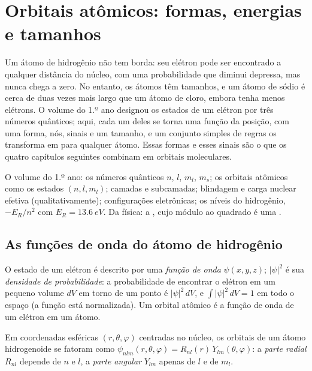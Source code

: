 \chapter{Orbitais atômicos: formas, energias e tamanhos}\label{ch:b2:atomic-orbitals}

Um átomo de hidrogênio não tem borda: seu elétron pode ser encontrado a
qualquer distância do núcleo, com uma probabilidade que diminui depressa, mas
nunca chega a zero. No entanto, os átomos têm tamanhos, e um átomo de sódio
é cerca de duas vezes mais largo que um átomo de cloro, embora tenha menos
elétrons. O volume do 1.º ano designou os estados de um elétron por três
números quânticos; aqui, cada um deles se torna uma função da posição, com
uma forma, nós, sinais e um tamanho, e um conjunto simples de regras os
transforma em  para qualquer átomo. Essas formas e esses
sinais são o que os quatro capítulos seguintes combinam em orbitais
moleculares.

\begin{recall}
O volume do 1.º ano: os números quânticos $n$, $l$, $m_l$, $m_s$; os orbitais
atômicos como os estados $(n, l, m_l)$; camadas e subcamadas; blindagem e
carga nuclear efetiva (qualitativamente); configurações eletrônicas; os níveis
do hidrogênio, $-E_R/n^2$ com $E_R = \qty{13.6}{eV}$. Da física: a , cujo módulo ao quadrado é uma .
\end{recall}

\section{As funções de onda do átomo de hidrogênio}

\begin{definition}\label{def:b2:atomic-orbitals:wavefunction}
O estado de um elétron é descrito por uma \emph{função de onda}
$\psi(x, y, z)$; $|\psi|^2$ é sua \emph{densidade de probabilidade}:
a probabilidade de encontrar o elétron em um pequeno volume $dV$ em torno de
um ponto é $|\psi|^2\,dV$, e $\int|\psi|^2\,dV = 1$ em todo o espaço (a função
está normalizada). Um orbital atômico é a função de onda de um elétron em um
átomo.
\end{definition}

\begin{definition}\label{def:b2:atomic-orbitals:radial-angular}
Em coordenadas esféricas $(r, \theta, \varphi)$ centradas no núcleo, os orbitais
de um átomo hidrogenoide se fatoram como $\psi_{nlm}(r, \theta, \varphi) = R_{nl}(r)\,
Y_{lm}(\theta, \varphi)$: a \emph{parte radial} $R_{nl}$ depende
de $n$ e $l$, a \emph{parte angular} $Y_{lm}$ apenas de $l$ e de
$m_l$.
\end{definition}

